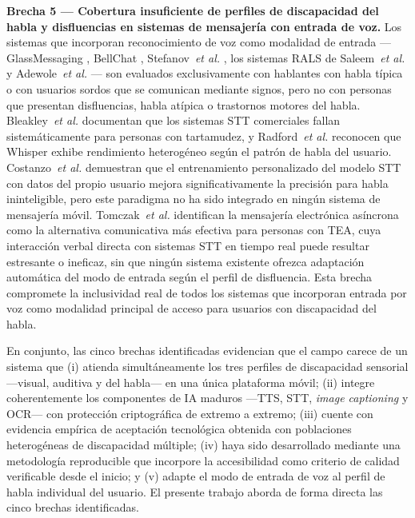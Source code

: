\documentclass[journal]{IEEEtran}
\begin{document}
			\textbf{Brecha 5 --- Cobertura insuficiente de perfiles de discapacidad del habla y disfluencias en sistemas de mensajer\'ia con entrada de voz.} Los sistemas que incorporan reconocimiento de voz como modalidad de entrada ---GlassMessaging \cite{janaka2023}, BellChat \cite{guerrero2021bellchat}, Stefanov~\textit{et al.} \cite{stefanov2024}, los sistemas RALS de Saleem~\textit{et al.} \cite{saleem2023} y Adewole~\textit{et al.} \cite{papatsimouli2023}--- son evaluados exclusivamente con hablantes con habla t\'ipica o con usuarios sordos que se comunican mediante signos, pero no con personas que presentan disfluencias, habla at\'ipica o trastornos motores del habla. Bleakley~\textit{et al.} \cite{bleakley2022} documentan que los sistemas STT comerciales fallan sistem\'aticamente para personas con tartamudez, y Radford~\textit{et al.} \cite{radford2023} reconocen que Whisper exhibe rendimiento heterog\'eneo seg\'un el patr\'on de habla del usuario. Costanzo~\textit{et al.} \cite{costanzo2023} demuestran que el entrenamiento personalizado del modelo STT con datos del propio usuario mejora significativamente la precisi\'on para habla ininteligible, pero este paradigma no ha sido integrado en ning\'un sistema de mensajer\'ia m\'ovil. Tomczak~\textit{et al.} \cite{tomczak2021} identifican la mensajer\'ia electr\'onica as\'incrona como la alternativa comunicativa m\'as efectiva para personas con TEA, cuya interacci\'on verbal directa con sistemas STT en tiempo real puede resultar estresante o ineficaz, sin que ning\'un sistema existente ofrezca adaptaci\'on autom\'atica del modo de entrada seg\'un el perfil de disfluencia. Esta brecha compromete la inclusividad real de todos los sistemas que incorporan entrada por voz como modalidad principal de acceso para usuarios con discapacidad del habla.
			
			En conjunto, las cinco brechas identificadas evidencian que el campo carece de un sistema que (i) atienda simult\'aneamente los tres perfiles de discapacidad sensorial ---visual, auditiva y del habla--- en una \'unica plataforma m\'ovil; (ii) integre coherentemente los componentes de IA maduros ---TTS, STT, \textit{image captioning} y OCR--- con protecci\'on criptogr\'afica de extremo a extremo; (iii) cuente con evidencia emp\'irica de aceptaci\'on tecnol\'ogica obtenida con poblaciones heterog\'eneas de discapacidad m\'ultiple; (iv) haya sido desarrollado mediante una metodolog\'ia reproducible que incorpore la accesibilidad como criterio de calidad verificable desde el inicio; y (v) adapte el modo de entrada de voz al perfil de habla individual del usuario. El presente trabajo aborda de forma directa las cinco brechas identificadas.
	
\end{document}
